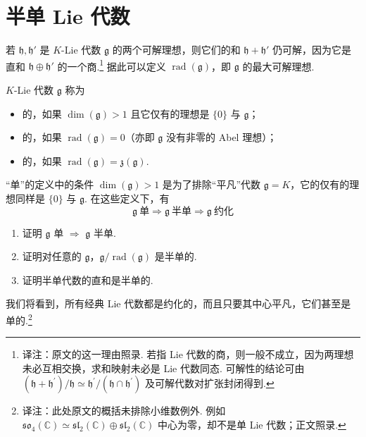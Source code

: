 \section{半单 Lie 代数}\label{sec:ssl-2-5}
若 $\mathfrak h,\mathfrak h'$ 是 $K$-Lie 代数 $\mathfrak g$ 的两个可解理想，则它们的和 $\mathfrak h+\mathfrak h'$ 仍可解，因为它是直和 $\mathfrak h\oplus\mathfrak h'$ 的一个商.\footnote{译注：原文的这一理由照录. 若指 Lie 代数的商，则一般不成立，因为两理想未必互相交换，求和映射未必是 Lie 代数同态. 可解性的结论可由 $(\mathfrak h+\mathfrak h^{\prime})/\mathfrak h\simeq\mathfrak h^{\prime}/(\mathfrak h\cap\mathfrak h^{\prime})$ 及可解代数对扩张封闭得到.} 据此可以定义 $\operatorname{rad}(\mathfrak g)$，即 $\mathfrak g$ 的最大可解理想.
\begin{definition}\label{def:ssl-2-5-1}
$K$-Lie 代数 $\mathfrak g$ 称为
\begin{itemize}[label=\textendash]
\item {}的，如果 $\dim(\mathfrak g)>1$ 且它仅有的理想是 $\{0\}$ 与 $\mathfrak g$；
\item {}的，如果 $\operatorname{rad}(\mathfrak g)=0$（亦即 $\mathfrak g$ 没有非零的 Abel 理想）；
\item {}的，如果 $\operatorname{rad}(\mathfrak g)=\mathfrak z(\mathfrak g)$.
\end{itemize}
\end{definition}
\begin{remark*}
``单''的定义中的条件 $\dim(\mathfrak g)>1$ 是为了排除``平凡''代数 $\mathfrak g=K$，它的仅有的理想同样是 $\{0\}$ 与 $\mathfrak g$. 在这些定义下，有
\[\mathfrak g\ \text{单}\Longrightarrow\mathfrak g\ \text{半单}\Longrightarrow\mathfrak g\ \text{约化}\]
\end{remark*}
\begin{exercise*}
\begin{enumerate}[label=\roman*)]
\item 证明 $\mathfrak g$ 单 $\Rightarrow$ $\mathfrak g$ 半单.
\item 证明对任意的 $\mathfrak g$，$\mathfrak g/\operatorname{rad}(\mathfrak g)$ 是半单的.
\item 证明半单代数的直和是半单的.
\end{enumerate}
\end{exercise*}
我们将看到，所有经典 Lie 代数都是约化的，而且只要其中心平凡，它们甚至是单的.\footnote{译注：此处原文的概括未排除小维数例外. 例如 $\mathfrak{so}_4(\mathbb C)\simeq\mathfrak{sl}_2(\mathbb C)\oplus\mathfrak{sl}_2(\mathbb C)$ 中心为零，却不是单 Lie 代数；正文照录.}

